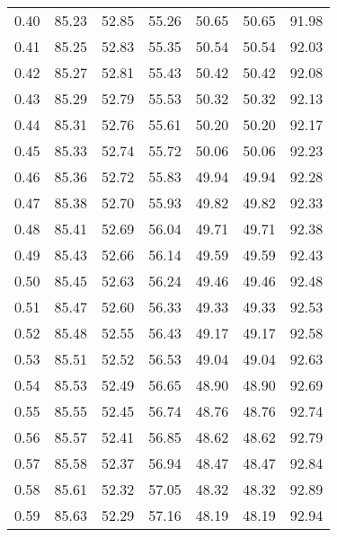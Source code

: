 \begin{tabular}{|c|c|c|c|c|c|c|}
      0.40 &     85.23 &     52.85 &      55.26 &   50.65 &      50.65 &         91.98 \\
      0.41 &     85.25 &     52.83 &      55.35 &   50.54 &      50.54 &         92.03 \\
      0.42 &     85.27 &     52.81 &      55.43 &   50.42 &      50.42 &         92.08 \\
      0.43 &     85.29 &     52.79 &      55.53 &   50.32 &      50.32 &         92.13 \\
      0.44 &     85.31 &     52.76 &      55.61 &   50.20 &      50.20 &         92.17 \\
      0.45 &     85.33 &     52.74 &      55.72 &   50.06 &      50.06 &         92.23 \\
      0.46 &     85.36 &     52.72 &      55.83 &   49.94 &      49.94 &         92.28 \\
      0.47 &     85.38 &     52.70 &      55.93 &   49.82 &      49.82 &         92.33 \\
      0.48 &     85.41 &     52.69 &      56.04 &   49.71 &      49.71 &         92.38 \\
      0.49 &     85.43 &     52.66 &      56.14 &   49.59 &      49.59 &         92.43 \\
      0.50 &     85.45 &     52.63 &      56.24 &   49.46 &      49.46 &         92.48 \\
      0.51 &     85.47 &     52.60 &      56.33 &   49.33 &      49.33 &         92.53 \\
      0.52 &     85.48 &     52.55 &      56.43 &   49.17 &      49.17 &         92.58 \\
      0.53 &     85.51 &     52.52 &      56.53 &   49.04 &      49.04 &         92.63 \\
      0.54 &     85.53 &     52.49 &      56.65 &   48.90 &      48.90 &         92.69 \\
      0.55 &     85.55 &     52.45 &      56.74 &   48.76 &      48.76 &         92.74 \\
      0.56 &     85.57 &     52.41 &      56.85 &   48.62 &      48.62 &         92.79 \\
      0.57 &     85.58 &     52.37 &      56.94 &   48.47 &      48.47 &         92.84 \\
      0.58 &     85.61 &     52.32 &      57.05 &   48.32 &      48.32 &         92.89 \\
      0.59 &     85.63 &     52.29 &      57.16 &   48.19 &      48.19 &         92.94 \\

\end{tabular}
